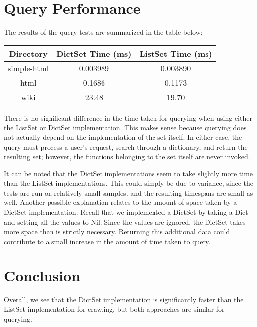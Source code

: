 \documentclass{article}
\begin{document}
\section{Query Performance}

The results of the query tests are summarized in the table below:

\begin{center}
\begin{tabular}{ |c|c|c| } 
\hline
Directory & DictSet Time (ms) & ListSet Time (ms) \\ 
\hline
simple-html & 0.003989 & 0.003890 \\ 
\hline
html & 0.1686 & 0.1173 \\ 
\hline
wiki & 23.48 & 19.70 \\
\hline
\end{tabular}
\end{center}

There is no significant difference in the time taken for querying when using either the ListSet or DictSet implementation. This makes sense because querying does not actually depend on the implementation of the set itself. In either case, the query must process a user's request, search through a dictionary, and return the resulting set; however, the functions belonging to the set itself are never invoked. 

It can be noted that the DictSet implementations seem to take slightly more time than the ListSet implementations. This could simply be due to variance, since the tests are run on relatively small samples, and the resulting timespans are small as well. Another possible explanation relates to the amount of space taken by a DictSet implementation. Recall that we implemented a DictSet by taking a Dict and setting all the values to Nil. Since the values are ignored, the DictSet takes more space than is strictly necessary. Returning this additional data could contribute to a small increase in the amount of time taken to query. 

\section{Conclusion}

Overall, we see that the DictSet implementation is significantly faster than the ListSet implementation for crawling, but both approaches are similar for querying. 
\end{document}
